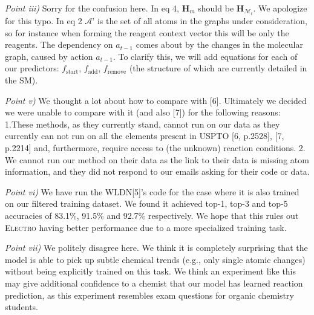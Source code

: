 \documentclass{article}
\newcommand{\ourModel}{\textsc{Electro}\xspace}
\begin{document}

\emph{Point iii)} 
Sorry for the confusion here. In eq 4, $\bm{H}_m$ should be $\bm{H}_{\mathcal{M}_t}$. We apologize for this typo.
In eq 2 $\mathcal{A}’$ is the set of all atoms in the graphs under consideration, so for instance when forming the reagent context vector this will be only the reagents.
The dependency on $a_{t-1}$ comes about by the changes in the molecular graph, caused by action $a_{t-1}$. 
To clarify this, we will add equations for each of our predictors: $f_\textrm{start}$, $f_\textrm{add}$, $f_\textrm{remove}$ (the structure of which are currently detailed in the SM).

\emph{Point v)} 
We thought a lot about how to compare with [6].
 Ultimately we decided we were unable to compare with it (and also [7]) for the following reasons:
  1.These methods, as they currently stand, cannot run on our data as they currently can not run on all the elements present in USPTO [6, p.2528], [7, p.2214] and, furthermore, require access to (the unknown) reaction conditions. 
 2. We cannot run our method on their data as the link to their data is missing atom information, and they did not respond to our emails asking for their code or data. 

\emph{Point vi)} We have run the WLDN[5]'s code for the case where it is also trained on our filtered training dataset.
 We found it achieved top-1, top-3 and top-5 accuracies of 83.1\%, 91.5\% and 92.7\% respectively. 
 We hope that this rules out \ourModel having better performance due to a more specialized training task.
  
\emph{Point vii)}
 We politely disagree here.
  We think it is completely surprising that the model is able to pick up subtle chemical trends (e.g., only single atomic changes) without being explicitly trained on this task.
   We think an experiment like this may give additional confidence to a chemist that our model has learned reaction prediction, as this experiment resembles exam questions for organic chemistry students. 
 
\end{document}
